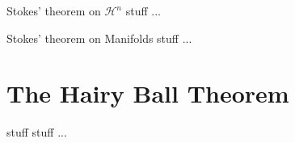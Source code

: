 \documentclass[9pt]{beamer}
\begin{document}
\begin{frame}
    \begin{block}{Stokes' theorem on $\mathcal{H}^n$}
        stuff ...
    \end{block}
\end{frame}

\begin{frame}
    \begin{block}{Stokes' theorem on Manifolds}
        stuff ...
    \end{block}
\end{frame}

\section{The Hairy Ball Theorem}

\begin{frame}
    \begin{block}{stuff}
        stuff ...
    \end{block}
\end{frame}
\end{document}
